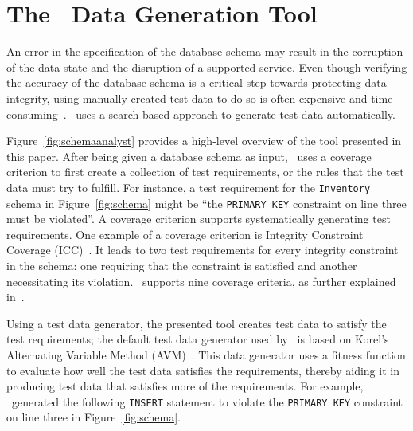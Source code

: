 \section{The \sa~Data Generation Tool}\label{sec:technique}


An error in the specification of the database schema may result in the corruption of the data state and the disruption
of a supported service.  Even though verifying the accuracy of the database schema is a critical step towards protecting
data integrity, using manually created test data to do so is often expensive and time
consuming~\cite{kapfhammer2013search}.  \sa~uses a search-based approach to generate test data automatically.


Figure~\ref{fig:schemaanalyst} provides a high-level overview of the tool presented in this paper.  After being given a
database schema as input, \sa~uses a coverage criterion to first create a collection of test requirements, or the
rules that the test data must try to fulfill.  For instance, a test requirement for the \texttt{Inventory} schema in
Figure~\ref{fig:schema} might be ``the \texttt{PRIMARY KEY} constraint on line three must be violated''. A coverage
criterion supports systematically generating test requirements.  One example of a coverage criterion is Integrity
Constraint Coverage (ICC)~\cite{mcminn2015effectiveness}. It leads to two test requirements for every integrity
constraint in the schema: one requiring that the constraint is satisfied and another necessitating its violation.
\sa~supports nine coverage criteria, as further explained in~\cite{mcminn2015effectiveness}.


Using a test data generator, the presented tool creates test data to satisfy the test requirements; the default test
data generator used by \sa~is based on Korel's Alternating Variable Method (AVM)~\cite{Korel:AVM}. This data generator
uses a fitness function to evaluate how well the test data satisfies the requirements, thereby aiding it in producing
test data that satisfies more of the requirements. For example, \sa~generated the following \texttt{INSERT} statement to
violate the \texttt{PRIMARY KEY} constraint on line three in Figure~\ref{fig:schema}.

